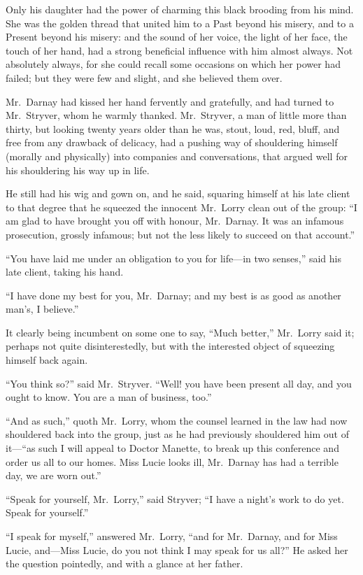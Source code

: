 Only his daughter had the power of charming this black brooding from
his mind.  She was the golden thread that united him to a Past beyond
his misery, and to a Present beyond his misery:  and the sound of her
voice, the light of her face, the touch of her hand, had a strong
beneficial influence with him almost always.  Not absolutely always,
for she could recall some occasions on which her power had failed;
but they were few and slight, and she believed them over.

Mr.\ Darnay had kissed her hand fervently and gratefully, and had
turned to Mr.\ Stryver, whom he warmly thanked.  Mr.\ Stryver, a man of
little more than thirty, but looking twenty years older than he was,
stout, loud, red, bluff, and free from any drawback of delicacy,
had a pushing way of shouldering himself (morally and physically)
into companies and conversations, that argued well for his shouldering
his way up in life.

He still had his wig and gown on, and he said, squaring himself at his
late client to that degree that he squeezed the innocent Mr.\ Lorry
clean out of the group:  ``I am glad to have brought you off with honour,
Mr.\ Darnay.  It was an infamous prosecution, grossly infamous;
but not the less likely to succeed on that account.''

``You have laid me under an obligation to you for life---in two senses,''
said his late client, taking his hand.

``I have done my best for you, Mr.\ Darnay; and my best is as good as
another man's, I believe.''

It clearly being incumbent on some one to say, ``Much better,'' Mr.\ Lorry
said it; perhaps not quite disinterestedly, but with the interested
object of squeezing himself back again.

``You think so?'' said Mr.\ Stryver.  ``Well! you have been present all day,
and you ought to know.  You are a man of business, too.''

``And as such,'' quoth Mr.\ Lorry, whom the counsel learned in the law
had now shouldered back into the group, just as he had previously
shouldered him out of it---``as such I will appeal to Doctor Manette,
to break up this conference and order us all to our homes.
Miss Lucie looks ill, Mr.\ Darnay has had a terrible day, we are worn out.''

``Speak for yourself, Mr.\ Lorry,'' said Stryver; ``I have a night's work
to do yet.  Speak for yourself.''

``I speak for myself,'' answered Mr.\ Lorry, ``and for Mr.\ Darnay, and for
Miss Lucie, and---Miss Lucie, do you not think I may speak for us all?''
He asked her the question pointedly, and with a glance at her father.

